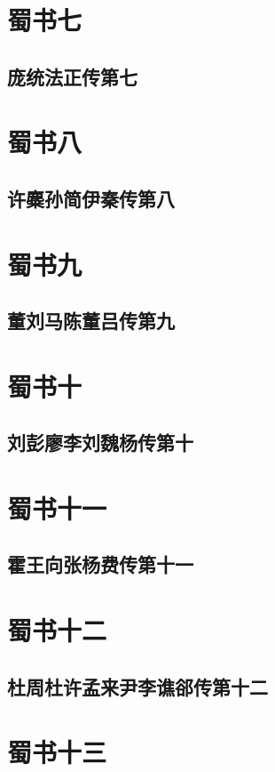 \documentclass[12pt,UTF8]{ctexbook}
\begin{document}
\part{蜀书七}
\chapter{庞统法正传第七}

\part{蜀书八}
\chapter{许麋孙简伊秦传第八}

\part{蜀书九}
\chapter{董刘马陈董吕传第九}

\part{蜀书十}
\chapter{刘彭廖李刘魏杨传第十}

\part{蜀书十一}
\chapter{霍王向张杨费传第十一}

\part{蜀书十二}
\chapter{杜周杜许孟来尹李谯郤传第十二}

\part{蜀书十三}
\end{document}
